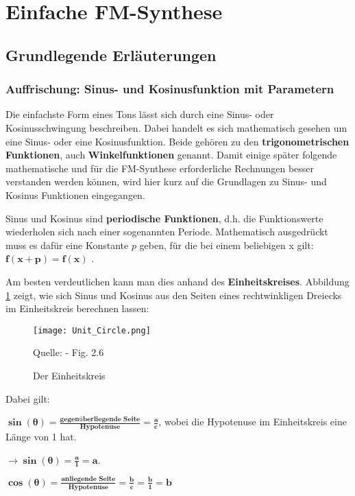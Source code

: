 \section{Einfache FM-Synthese}
\label{einfacheFM}
\FloatBarrier
\subsection{Grundlegende Erläuterungen}
\subsubsection{Auffrischung: Sinus- und Kosinusfunktion mit Parametern}
Die einfachste Form eines Tons lässt sich durch eine Sinus- oder Kosinusschwingung beschreiben. Dabei handelt es sich mathematisch gesehen um eine Sinus- oder eine Kosinusfunktion. Beide gehören zu den \textbf{trigonometrischen Funktionen}, auch \textbf{Winkelfunktionen} genannt. Damit einige später folgende mathematische und für die FM-Synthese erforderliche Rechnungen besser verstanden werden können, wird hier kurz auf die Grundlagen zu Sinus- und Kosinus Funktionen eingegangen. 

Sinus und Kosinus sind \textbf{periodische Funktionen}, d.h. die Funktionswerte wiederholen sich nach einer sogenannten Periode. Mathematisch ausgedrückt muss es dafür eine Konstante $p$  geben, für die bei einem beliebigen x gilt: $\bm{f(x + p) =  f(x)}$ .

Am besten verdeutlichen kann man dies anhand des \textbf{Einheitskreises}. Abbildung \ref{fig:unitcircle} zeigt, wie sich Sinus und Kosinus aus den Seiten eines rechtwinkligen Dreiecks im Einheitskreis berechnen lassen:

\begin{figure} [ht]
\centering
\texttt{[image: Unit\_Circle.png]}
\caption{Der Einheitskreis}
\label{fig:unitcircle}
Quelle: \cite{fmtheory} - Fig. 2.6
\end{figure}

Dabei gilt: 

$\bm{\sin(\theta) = \frac{\textbf{gegenüberliegende Seite}}{\textbf{Hypotenuse}} = \frac{a}{c}}$, wobei die Hypotenuse im Einheitskreis eine Länge von 1 hat. 

$\bm{\to\sin(\theta) = \frac{a}{1} = a}$.

$\bm{\cos(\theta) = \frac{\textbf{anliegende Seite}}{\textbf{Hypotenuse}} = \frac{b}{c} = \frac{b}{1} = b}$ \cite[s. 22 - 27]{fmtheory} \\

